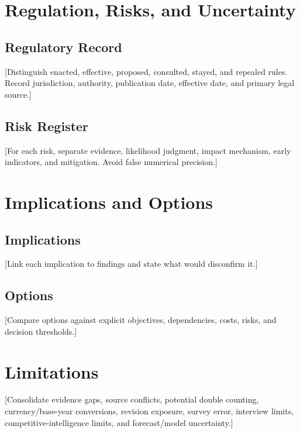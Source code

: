 \documentclass[11pt,letterpaper]{report}
\begin{document}
\chapter{Regulation, Risks, and Uncertainty}

\section{Regulatory Record}
[Distinguish enacted, effective, proposed, consulted, stayed, and repealed
rules. Record jurisdiction, authority, publication date, effective date, and
primary legal source.]

\section{Risk Register}
[For each risk, separate evidence, likelihood judgment, impact mechanism,
early indicators, and mitigation. Avoid false numerical precision.]

\chapter{Implications and Options}

\section{Implications}
[Link each implication to findings and state what would disconfirm it.]

\section{Options}
[Compare options against explicit objectives, dependencies, costs, risks, and
decision thresholds.]

\begin{recommendationbox}
\end{recommendationbox}

\chapter{Limitations}
[Consolidate evidence gaps, source conflicts, potential double counting,
currency/base-year conversions, revision exposure, survey error, interview
limits, competitive-intelligence limits, and forecast/model uncertainty.]
\end{document}
